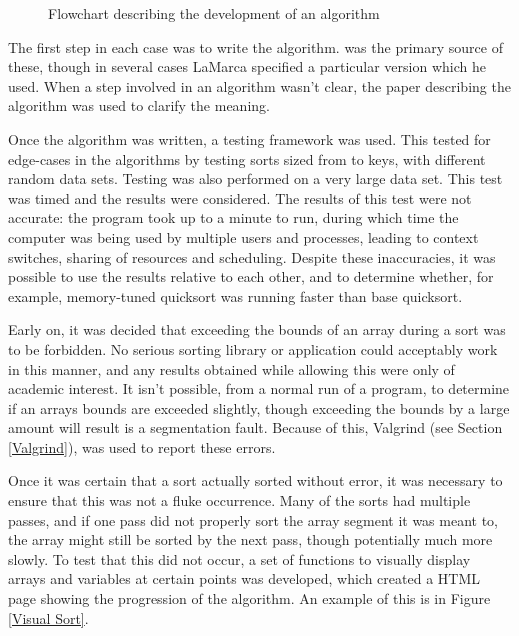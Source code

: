 \begin{figure}
\caption{Flowchart describing the development of an algorithm}
\label{Flowchart}
\end{figure}


The first step in each case was to write the algorithm. \cite{Sedgewick02} was
the primary source of these, though in several cases LaMarca specified a
particular version which he used. When a step involved in an algorithm wasn't
clear, the paper describing the algorithm was used to clarify the meaning.

Once the algorithm was written, a testing framework was used. This tested for
edge-cases in the algorithms by testing sorts sized from  to 
keys, with different random data sets. Testing was also performed on a very
large data set. This test was timed and the results were considered. The
results of this test were not accurate: the program took up to a minute to run,
during which time the computer was being used by multiple users and processes,
leading to context switches, sharing of resources and scheduling. Despite these
inaccuracies, it was possible to use the results relative to each other, and to
determine whether, for example, memory-tuned quicksort was running faster than
base quicksort.

Early on, it was decided that exceeding the bounds of an array
during a sort was to be forbidden. No serious sorting library or application
could acceptably work in this manner, and any results obtained while allowing
this were only of academic interest. It isn't possible, from a normal run of a
program, to determine if an arrays bounds are exceeded slightly, though exceeding
the bounds by a large amount will result is a segmentation fault. Because of
this, Valgrind (see Section \ref{Valgrind}), was used to report these errors.

Once it was certain that a sort actually sorted without error, it was necessary
to ensure that this was not a fluke occurrence. Many of the sorts had multiple
passes, and if one pass did not properly sort the array segment it was meant to,
the array might still be sorted by the next pass, though potentially much more
slowly. To test that this did not occur, a set of functions to visually display
arrays and variables at certain points was developed, which created a HTML page
showing the progression of the algorithm. An example of this is in Figure
\vref{Visual Sort}.

